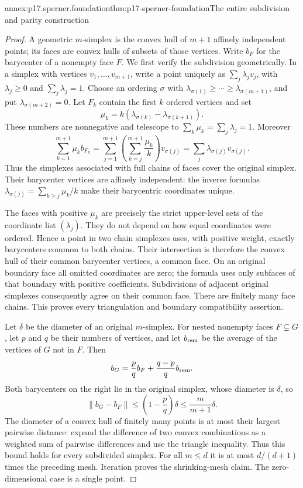 \begin{annexitem}{annex:p17.sperner.foundation}{thm:p17-sperner-foundation}{The entire subdivision and parity construction}
\begin{proof}
A geometric \(m\)-simplex is the convex hull of \(m+1\)
affinely independent points; its faces are convex hulls
of subsets of those vertices. Write \(b_F\) for the
barycenter of a nonempty face \(F\). We first verify the
subdivision geometrically. In a simplex with vertices
\(v_1,\ldots,v_{m+1}\), write a point uniquely as
\(\sum_j\lambda_jv_j\), with \(\lambda_j\geq0\) and
\(\sum_j\lambda_j=1\).
Choose an ordering \(\sigma\) with
\(\lambda_{\sigma(1)}\geq\cdots\geq\lambda_{\sigma(m+1)}\),
and put \(\lambda_{\sigma(m+2)}=0\).
Let \(F_k\) contain the first \(k\) ordered vertices and set
\[
                  \mu_k=k(\lambda_{\sigma(k)}
                                      -\lambda_{\sigma(k+1)}).
\]
These numbers are nonnegative and telescope to
\(\sum_k\mu_k=\sum_j\lambda_j=1\). Moreover
\[
 \sum_{k=1}^{m+1}\mu_k b_{F_k}
   =\sum_{j=1}^{m+1}
         \left(\sum_{k=j}^{m+1}\frac{\mu_k}{k}\right)v_{\sigma(j)}
   =\sum_j\lambda_{\sigma(j)}v_{\sigma(j)}.
\]
Thus the simplexes associated with full chains of faces
cover the original simplex. Their barycenter vertices
are affinely independent: the inverse formulas
\(\lambda_{\sigma(j)}=\sum_{k\geq j}\mu_k/k\)
make their barycentric coordinates unique.

The faces with positive \(\mu_k\) are precisely the
strict upper-level sets of the coordinate list
\((\lambda_j)\). They do not depend on how equal
coordinates were ordered. Hence a point in two
chain simplexes uses, with positive weight, exactly
barycenters common to both chains. Their intersection
is therefore the convex hull of their common
barycenter vertices, a common face. On an original
boundary face all omitted coordinates are zero;
the formula uses only subfaces of that boundary
with positive coefficients. Subdivisions of adjacent
original simplexes consequently agree on their
common face. There are finitely many face chains.
This proves every triangulation and boundary
compatibility assertion.

Let \(\delta\) be the diameter of an original
\(m\)-simplex. For nested nonempty faces \(F\subsetneq G\),
let \(p\) and \(q\) be their numbers of vertices, and let
\(b_{\rm rem}\) be the average of the vertices of \(G\)
not in \(F\). Then
\[
       b_G=\frac{p}{q}b_F+\frac{q-p}{q}b_{\rm rem}.
\]
Both barycenters on the right lie in the original
simplex, whose diameter is \(\delta\), so
\[
             \|b_G-b_F\|
                 \leq\left(1-\frac{p}{q}\right)\delta
                 \leq\frac{m}{m+1}\delta.
\]
The diameter of a convex hull of finitely many points
is at most their largest pairwise distance: expand
the difference of two convex combinations as a
weighted sum of pairwise differences and use the
triangle inequality. Thus this bound holds for
every subdivided simplex. For all \(m\leq d\)
it is at most \(d/(d+1)\) times the preceding
mesh. Iteration proves the shrinking-mesh claim.
The zero-dimensional case is a single point.


\end{proof}
\end{annexitem}
